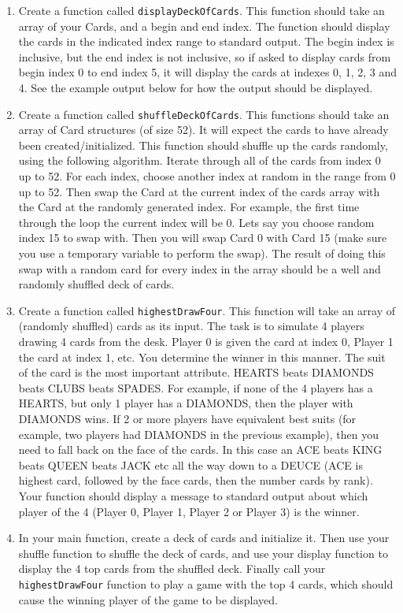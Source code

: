 \documentclass[11pt]{article}
\begin{document}
\begin{enumerate}
\item Create a function called \verb~displayDeckOfCards~.  This function
should take an array of your Cards, and a begin and end index.  The
function should display the cards in the indicated index range to
standard output.  The begin index is inclusive, but the end index
is not inclusive, so if asked to display cards from begin index 0
to end index 5, it will display the cards at indexes 0, 1, 2, 3
and 4.  See the example output below for how the output should be
displayed.

\item Create a function called \verb~shuffleDeckOfCards~.  This functions
should take an array of Card structures (of size 52).  It will
expect the cards to have already been created/initialized.  This
function should shuffle up the cards randomly, using the following
algorithm.  Iterate through all of the cards from index 0 up to 52.
For each index, choose another index at random in the range
from 0 up to 52.  Then swap the Card at the current index of the
cards array with the Card at the randomly generated index.  For
example, the first time through the loop the current index will be 0.
Lets say you choose random index 15 to swap with.  Then you
will swap Card 0 with Card 15 (make sure you use a temporary
variable to perform the swap).  The result of doing this swap with
a random card for every index in the array should be a well and
randomly shuffled deck of cards.

\item Create a function called \verb~highestDrawFour~.  This function will
take an array of (randomly shuffled) cards as its input.  The
task is to simulate 4 players drawing 4 cards from the desk.  
Player 0 is given the card at index 0, Player 1 the card at
index 1, etc.  You determine the winner in this manner.  The
suit of the card is the most important attribute.  
HEARTS beats DIAMONDS beats CLUBS beats SPADES.  For example,
if none of the 4 players has a HEARTS, but only 1 player has
a DIAMONDS, then the player with DIAMONDS wins.  If 2 or more
players have equivalent best suits (for example, two players had
DIAMONDS in the previous example), then you need to fall back
on the face of the cards.  In this case an ACE beats KING beats
QUEEN beats JACK etc all the way down to a DEUCE (ACE is highest
card, followed by the face cards, then the number cards by rank).
Your function should display a message to standard output about
which player of the 4 (Player 0, Player 1, Player 2 or Player 3)
is the winner.

\item In your main function, create a deck of cards and initialize it.
Then use your shuffle function to shuffle the deck of cards, and
use your display function to display the 4 top cards from the
shuffled deck.  Finally call your \verb~highestDrawFour~ function
to play a game with the top 4 cards, which should cause
the winning player of the game to be displayed.
\end{enumerate}
\end{document}
